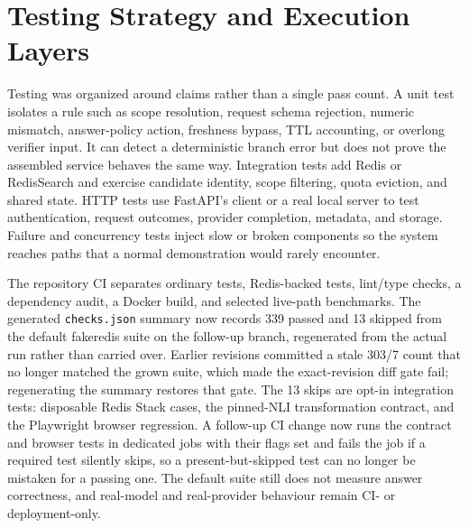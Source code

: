 \section{Testing Strategy and Execution Layers}
Testing was organized around claims rather than a single pass count. A unit test isolates a rule such as scope resolution, request schema rejection, numeric mismatch, answer-policy action, freshness bypass, TTL accounting, or overlong verifier input. It can detect a deterministic branch error but does not prove the assembled service behaves the same way. Integration tests add Redis or RedisSearch and exercise candidate identity, scope filtering, quota eviction, and shared state. HTTP tests use FastAPI's client or a real local server to test authentication, request outcomes, provider completion, metadata, and storage. Failure and concurrency tests inject slow or broken components so the system reaches paths that a normal demonstration would rarely encounter.

The repository CI separates ordinary tests, Redis-backed tests, lint/type checks, a dependency audit, a Docker build, and selected live-path benchmarks. The generated \texttt{checks.json} summary now records 339 passed and 13 skipped from the default fakeredis suite on the follow-up branch, regenerated from the actual run rather than carried over. Earlier revisions committed a stale 303/7 count that no longer matched the grown suite, which made the exact-revision diff gate fail; regenerating the summary restores that gate. The 13 skips are opt-in integration tests: disposable Redis Stack cases, the pinned-NLI transformation contract, and the Playwright browser regression. A follow-up CI change now runs the contract and browser tests in dedicated jobs with their flags set and fails the job if a required test silently skips, so a present-but-skipped test can no longer be mistaken for a passing one. The default suite still does not measure answer correctness, and real-model and real-provider behaviour remain CI- or deployment-only.

